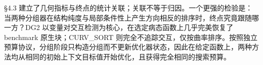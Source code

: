 §4.3 建立了几何指标与终点的统计关联；关联不等于归因。一个更强的检验是：当两种分组器在结构纯度与局部条件性上产生方向相反的排序时，终点究竟跟随哪一方？DG2 以变量对交互检测为核心，在选定病态函数上几乎完美恢复了 benchmark 原生块；CURV\_SORT 则完全不追踪交互，仅按曲率排序。按照独立预算协议，分组阶段只构造分组而不更新优化器状态，因此在给定函数上，两种方法均从相同的初始上下文目标值开始优化，且获得完全相同的搜索预算。
